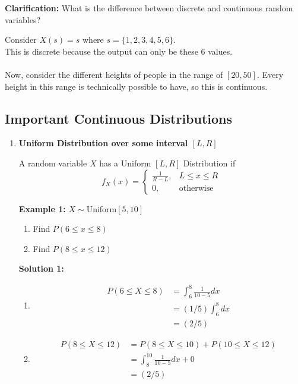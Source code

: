\documentclass[12pt, twoside]{article}
\begin{document}
\textbf{Clarification: } What is the difference between discrete and continuous random variables?

Consider $X(s) = s$ where $s = \{1,2,3,4,5,6 \}$.\\
This is discrete because the output can only be these 6 values.\\
\\
Now, consider the different heights of people in the range of $[20,50]$. Every height in this range is technically possible to have, so this is continuous.

\subsection{Important Continuous Distributions}

\begin{enumerate}
	\item{
	\textbf{Uniform Distribution over some interval $[L,R]$}
	
	\begin{tcolorbox}[title=Defintion: Uniform Distribution]
		A random variable $X$ has a Uniform $[L,R]$ Distribution if 
		$$f_X (x) = \begin{cases}
		\frac{1}{R-L} , & L \leq x \leq R\\
		0 , & \text{otherwise}
		\end{cases}$$
	\end{tcolorbox}

	\textbf{Example 1:} $X \sim $Uniform$[5,10]$
	\begin{enumerate}
		\item{Find $P(6 \leq x \leq 8)$}
		\item{Find $P(8 \leq x \leq 12)$}
	\end{enumerate}
	
	\textbf{Solution 1:}
	\begin{enumerate}
		\item{
		\begin{align*}
			P(6 \leq X \leq 8) &= \int^{8}_{6} \frac{1}{10-5} dx\\
			&= (1/5) \int^{8}_{6} dx\\
			&= (2/5)
		\end{align*}
		}
		\item{
		\begin{align*}
			P(8 \leq X \leq 12) &= P(8 \leq X \leq 10) + P(10 \leq X \leq 12)\\
			&= \int^{10}_{8} \frac{1}{10-5} dx + 0\\
			&= (2/5)
		\end{align*}
		}
	\end{enumerate}
	}
	

\end{enumerate}
\end{document}
